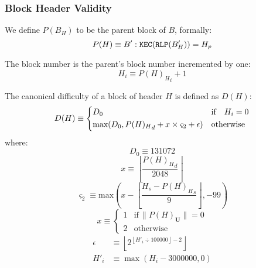 \documentclass[9pt,oneside]{amsart}
\begin{document}
\begin{multicols}{2}
\subsubsection{Block Header Validity}

We define $P(B_H)$ to be the parent block of $B$, formally:
\begin{equation}
P(H) \equiv B': \mathtt{\tiny KEC}(\mathtt{\tiny RLP}(B'_H)) = H_p
\end{equation}

The block number is the parent's block number incremented by one:
\begin{equation}
H_i \equiv {{P(H)_H}_i} + 1
\end{equation}

\newcommand{\mindifficulty}{D_0}
\newcommand{\homesteadmod}{\ensuremath{\varsigma_2}}
\newcommand{\expdiffsymb}{\ensuremath{\epsilon}}
\newcommand{\diffadjustment}{x}

The canonical difficulty of a block of header $H$ is defined as $D(H)$:
\begin{equation}
D(H) \equiv \begin{dcases}
\mindifficulty & \text{if} \quad H_i = 0\\
\text{max}\!\left(\mindifficulty, {P(H)_H}_d + \diffadjustment\times\homesteadmod + \expdiffsymb \right) & \text{otherwise}\\
\end{dcases}
\end{equation}
where:
\begin{equation}
\mindifficulty \equiv 131072
\end{equation}
\begin{equation}
\diffadjustment \equiv \left\lfloor\frac{{P(H)_H}_d}{2048}\right\rfloor
\end{equation}
\begin{equation}
\homesteadmod \equiv \text{max}\left( x - \left\lfloor\frac{H_s - {P(H)_H}_s}{9}\right\rfloor, -99 \right)
\end{equation}
\begin{equation*}
x \equiv \begin{cases}
1 & \text{if} \, \lVert P(H)_\mathbf{U}\rVert = 0 \\
2 & \text{otherwise}
\end{cases}
\end{equation*}
\begin{align}
\expdiffsymb &\equiv \left\lfloor 2^{ \left\lfloor H'_i \div 100000 \right\rfloor - 2 } \right\rfloor \\
H'_i &\equiv \max(H_i - 3000000, 0)
\end{align}


\end{multicols}
\end{document}
